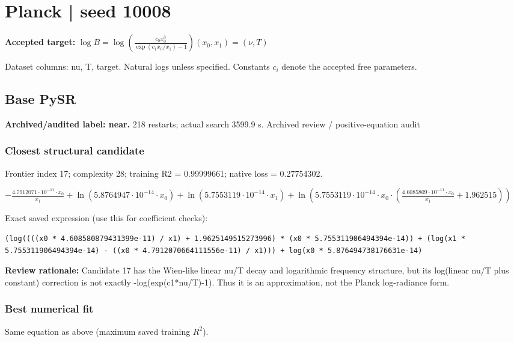 \documentclass[10pt,letterpaper,landscape]{article}
\begin{document}
\section*{Planck | seed 10008}
\textbf{Accepted target:} $\displaystyle \log B=\log\!\left(\frac{c_0 x_0^3}{\exp(c_1x_0/x_1)-1}\right)$\hfill $(x_0,x_1)=(\nu,T)$\par
{\small Dataset columns: nu, T, target. Natural logs unless specified. Constants $c_i$ denote the accepted free parameters.}\par\medskip
\begin{minipage}[t]{0.485\textwidth}
\subsection*{Base PySR}
\textbf{Archived/audited label: near.} 218 restarts; actual search 3599.9 s.
{\small Archived review / positive-equation audit}
\subsubsection*{Closest structural candidate}
Frontier index 17; complexity 28; training R2 = 0.99999661; native loss = 0.27754302.
\begin{center}\begin{adjustbox}{max width=\linewidth,max totalheight=1.0in}$\displaystyle - \frac{4.7912071 \cdot 10^{-11} \cdot x_{0}}{x_{1}} + \ln{\left(5.8764947 \cdot 10^{-14} \cdot x_{0} \right)} + \ln{\left(5.7553119 \cdot 10^{-14} \cdot x_{1} \right)} + \ln{\left(5.7553119 \cdot 10^{-14} \cdot x_{0} \cdot \left(\frac{4.6085809 \cdot 10^{-11} \cdot x_{0}}{x_{1}} + 1.962515\right) \right)}$\end{adjustbox}\end{center}
{\scriptsize Exact saved expression (use this for coefficient checks):}
\begin{lstlisting}
(log((((x0 * 4.608580879431399e-11) / x1) + 1.9625149515273996) * (x0 * 5.755311906494394e-14)) + (log(x1 * 5.755311906494394e-14) - ((x0 * 4.7912070664111556e-11) / x1))) + log(x0 * 5.876494738176631e-14)
\end{lstlisting}
{\small\textbf{Review rationale:} Candidate 17 has the Wien-like linear nu/T decay and logarithmic frequency structure, but its log(linear nu/T plus constant) correction is not exactly -log(exp(c1*nu/T)-1). Thus it is an approximation, not the Planck log-radiance form.}
\subsubsection*{Best numerical fit}
Same equation as above (maximum saved training $R^2$).
\end{minipage}\hfill
\end{document}
